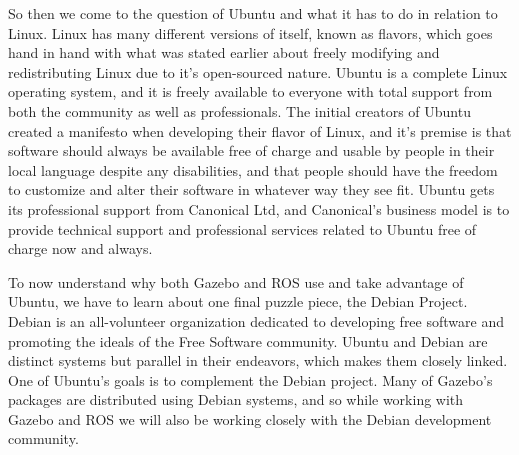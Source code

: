 \documentclass[12pt]{report}
\begin{document}
So then we come to the question of Ubuntu and what it has to do in relation to Linux. Linux has many different versions of itself, known as flavors, which goes hand in hand with what was stated earlier about freely modifying and redistributing Linux due to it's open-sourced nature. Ubuntu is a complete Linux operating system, and it is freely available to everyone with total support from both the community as well as professionals. The initial creators of Ubuntu created a manifesto when developing their flavor of Linux, and it's premise is that software should always be available free of charge and usable by people in their local language despite any disabilities, and that people should have the freedom to customize and alter their software in whatever way they see fit.\cite{Ubuntu} Ubuntu gets its professional support from Canonical Ltd, and Canonical's business model is to provide technical support and professional services related to Ubuntu free of charge now and always. 

To now understand why both Gazebo and ROS use and take advantage of Ubuntu, we have to learn about one final puzzle piece, the Debian Project. Debian is an all-volunteer organization dedicated to developing free software and promoting the ideals of the Free Software community. \cite{Debian} Ubuntu and Debian are distinct systems but parallel in their endeavors, which makes them closely linked. One of Ubuntu's goals is to complement the Debian project. Many of Gazebo's packages are distributed using Debian systems, and so while working with Gazebo and ROS we will also be working closely with the Debian development community.
\end{document}
